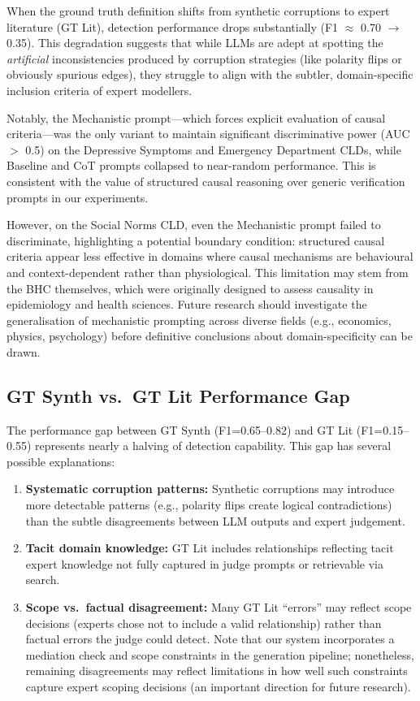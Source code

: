 When the ground truth definition shifts from synthetic corruptions to expert literature (GT Lit), detection performance drops substantially (F1 $\approx$ 0.70 $\rightarrow$ 0.35). This degradation suggests that while LLMs are adept at spotting the \textit{artificial} inconsistencies produced by corruption strategies (like polarity flips or obviously spurious edges), they struggle to align with the subtler, domain-specific inclusion criteria of expert modellers.

Notably, the Mechanistic prompt---which forces explicit evaluation of causal criteria---was the only variant to maintain significant discriminative power (AUC $>$ 0.5) on the Depressive Symptoms and Emergency Department CLDs, while Baseline and CoT prompts collapsed to near-random performance. This is consistent with the value of structured causal reasoning over generic verification prompts in our experiments.

However, on the Social Norms CLD, even the Mechanistic prompt failed to discriminate, highlighting a potential boundary condition: structured causal criteria appear less effective in domains where causal mechanisms are behavioural and context-dependent rather than physiological. This limitation may stem from the BHC themselves, which were originally designed to assess causality in epidemiology and health sciences. Future research should investigate the generalisation of mechanistic prompting across diverse fields (e.g., economics, physics, psychology) before definitive conclusions about domain-specificity can be drawn.

\subsection{GT Synth vs.\ GT Lit Performance Gap}

The performance gap between GT Synth (F1=0.65--0.82) and GT Lit (F1=0.15--0.55) represents nearly a halving of detection capability. This gap has several possible explanations:

\begin{enumerate}[noitemsep]
    \item \textbf{Systematic corruption patterns:} Synthetic corruptions may introduce more detectable patterns (e.g., polarity flips create logical contradictions) than the subtle disagreements between LLM outputs and expert judgement.
    \item \textbf{Tacit domain knowledge:} GT Lit includes relationships reflecting tacit expert knowledge not fully captured in judge prompts or retrievable via search.
    \item \textbf{Scope vs.\ factual disagreement:} Many GT Lit ``errors'' may reflect scope decisions (experts chose not to include a valid relationship) rather than factual errors the judge could detect. Note that our system incorporates a mediation check and scope constraints in the generation pipeline; nonetheless, remaining disagreements may reflect limitations in how well such constraints capture expert scoping decisions (an important direction for future research).
\end{enumerate}

